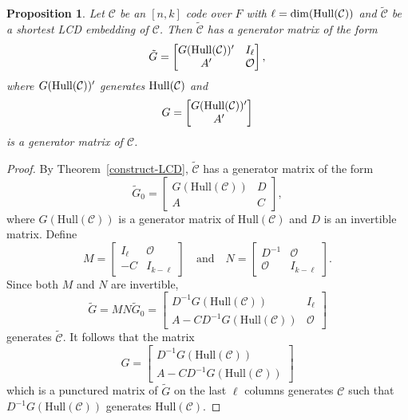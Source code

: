 \documentclass{article}
\newtheorem{proposition}[theorem]{Proposition}
\theoremstyle{definition}
\theoremstyle{remark}
\begin{document}
\begin{proposition}
    Let $\mathcal{C}$ be an $[n, k]$ code over $F$ with $\ell=\dim({\rm Hull}(\mathcal{C}))$ and $\tilde{\mathcal{C}}$ be a shortest LCD embedding of $\mathcal{C}$. Then $\tilde{\mathcal{C}}$ has a generator matrix of the form
    \[
    \tilde{G}=\begin{bmatrix}
        G({\rm Hull}(\mathcal{C}))' & I_\ell\\A' & \mathcal{O}
    \end{bmatrix},
    \]
    where $G({\rm Hull}(\mathcal{C}))'$ generates ${\rm Hull}(\mathcal{C})$ and
    \[
    G=\begin{bmatrix}
        G({\rm Hull}(\mathcal{C}))'\\A'
    \end{bmatrix}
    \]
    is a generator matrix of $\mathcal{C}$.
\end{proposition}
\begin{proof}
    By Theorem~\ref{construct-LCD}, $\tilde{\mathcal{C}}$ has a generator matrix of the form
    \[
    \tilde{G}_0=\begin{bmatrix}
        G(\text{Hull}(\mathcal{C})) & D\\A & C
    \end{bmatrix},
    \]
    where $G(\text{Hull}(\mathcal{C}))$ is a generator matrix of $\text{Hull}(\mathcal{C})$ and $D$ is an invertible matrix. Define
     \[
    M=\begin{bmatrix}
        I_\ell & \mathcal{O}\\-C & I_{k-\ell}
    \end{bmatrix}\quad\mbox{and}\quad N=\begin{bmatrix}
        D^{-1} & \mathcal{O}\\\mathcal{O} & I_{k-\ell}
    \end{bmatrix}.
    \]
    Since both $M$ and $N$ are invertible,
    \[
    \tilde{G}=MN\tilde{G}_0=\begin{bmatrix}
        D^{-1}G(\text{Hull}(\mathcal{C})) & I_\ell\\A-CD^{-1}G(\text{Hull}(\mathcal{C})) & \mathcal{O}
    \end{bmatrix}
    \]
    generates $\tilde{\mathcal{C}}$. It follows that the matrix
    \[
    G=\begin{bmatrix}
        D^{-1}G(\text{Hull}(\mathcal{C}))\\A-CD^{-1}G(\text{Hull}(\mathcal{C}))
    \end{bmatrix}
    \]
    which is a punctured matrix of $\tilde{G}$ on the last $\ell$ columns generates $\mathcal{C}$ such that $D^{-1}G(\text{Hull}(\mathcal{C}))$ generates $\text{Hull}(\mathcal{C})$.
\end{proof}
\end{document}

